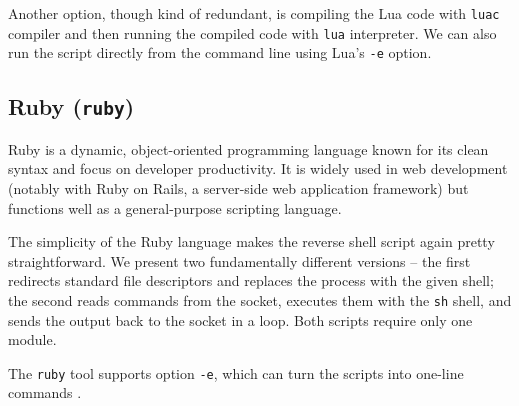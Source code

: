 
Another option, though kind of redundant, is compiling the Lua code with \texttt{luac} compiler and then running the compiled code with \texttt{lua} interpreter. We can also run the script directly from the command line using Lua's \texttt{-e} option.



\subsection{Ruby (\texttt{ruby})}


Ruby is a dynamic, object-oriented programming language known for its clean syntax and focus on developer productivity. It is widely used in web development (notably with Ruby on Rails, a server-side web application framework) but functions well as a general-purpose scripting language.

The simplicity of the Ruby language makes the reverse shell script again pretty straightforward. We present two fundamentally different versions -- the first redirects standard file descriptors and replaces the process with the given shell; the second reads commands from the socket, executes them with the \texttt{sh} shell, and sends the output back to the socket in a loop. Both scripts require only one module.




The \texttt{ruby} tool supports option \texttt{-e}, which can turn the scripts into one-line commands \cite{ruby-man}.

